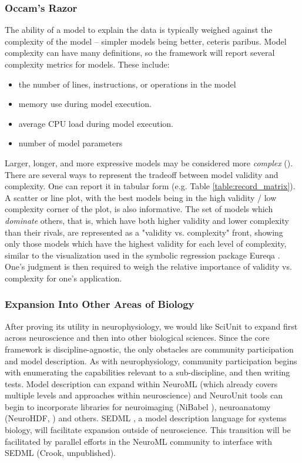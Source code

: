 \documentclass[11pt,letterpaper]{article}
\begin{document}
\subsubsection{Occam's Razor}
The ability of a model to explain the data is typically weighed against the complexity of the model -- simpler models being better, ceteris paribus.  Model complexity can have many definitions, so the framework will report several complexity metrics for models.  These include:
\begin{itemize}
\item the number of lines, instructions, or operations in the model
\item memory use during model execution.  
\item average CPU load during model execution.  
\item number of model parameters
\end{itemize}
Larger, longer, and more expressive models may be considered more \textit{complex} (\cite{mccabe_complexity_1976}).  There are several ways to represent the tradeoff between model validity and complexity.  One can report it in tabular form (e.g. Table \ref{table:record_matrix}).  A scatter or line plot, with the best models being in the high validity / low complexity corner of the plot, is also informative.  The set of models which \textit{dominate} others, that is, which have both higher validity and lower complexity than their rivals, are represented as a "validity vs. complexity" front, showing only those models which have the highest validity for each level of complexity, similar to the visualization used in the symbolic regression package Eureqa \cite{schmidt_distilling_2009}.  One's judgment is then required to weigh the relative importance of validity vs. complexity for one's application.  

\subsubsection{Expansion Into Other Areas of Biology}
After proving its utility in neurophysiology, we would like SciUnit to expand first across neuroscience and then into other biological sciences.  Since the core framework is discipline-agnostic, the only obstacles are community participation and model description.  As with neurophysiology, community participation begins with enumerating the capabilities relevant to a sub-discipline, and then writing tests.  Model description can expand within NeuroML (which already covers multiple levels and approaches within neuroscience) and NeuroUnit tools can begin to incorporate libraries for neuroimaging (NiBabel \cite{nibabel_url}), neuroanatomy (NeuroHDF, \cite{neurohdf_url}) and others.  SEDML \cite{hucka_systems_2003,sedml_url}, a model description language for systems biology, will facilitate expansion outside of neuroscience.  This transition will be facilitated by parallel efforts in the NeuroML community to interface with SEDML (Crook, unpublished).    
\end{document}
